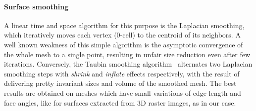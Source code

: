 \paragraph{Surface smoothing}
A linear time and space algorithm for this purpose is the Laplacian smoothing, which iteratively  moves each vertex (0-cell) to the centroid of its neighbors. A well known weakness of this simple algorithm is the asymptotic convergence of the whole mesh to a single point, resulting in unfair size reduction even after few iterations.  Conversely, the Taubin smoothing algorithm~\cite{Taubin:1995:SPA:218380.218473,egst.20001029} alternates two Laplacian smoothing steps with \emph{shrink} and \emph{inflate} effects respectively, with the result of delivering pretty invariant sizes and volume of the smoothed mesh. The best results are obtained on meshes which have small variations of edge length and face angles, like for surfaces extracted from 3D raster images, as in our case.
 

